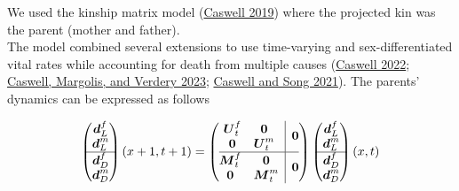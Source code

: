 \documentclass[
  11pt,
  letterpaper,
]{article}
\begin{document}
We used the kinship matrix model (\protect\hyperlink{ref-caswell2019formal}{Caswell 2019}) where the projected kin was the parent (mother and father).\\
The model combined several extensions to use time-varying and sex-differentiated vital rates while accounting for death from multiple causes (\protect\hyperlink{ref-caswell2022formal}{Caswell 2022}; \protect\hyperlink{ref-caswell2023formal}{Caswell, Margolis, and Verdery 2023}; \protect\hyperlink{ref-caswell2021formal}{Caswell and Song 2021}). The parents' dynamics can be expressed as follows

\[\begin{pmatrix} \boldsymbol{d}^f_L \\ 
\boldsymbol{d}^m_L \\ 
\hline \boldsymbol{d}^f_D \\ 
\boldsymbol{d}^m_D 
\end{pmatrix}(x+1, t+1) = 
\left(\begin{array}{@{}c|c@{}}
  \begin{matrix} 
  \boldsymbol{U}^f_t & \boldsymbol{0} \\ 
  \boldsymbol{0} & \boldsymbol{U}^m_t 
  \end{matrix} & \boldsymbol{0} \\
\hline
\begin{matrix} 
  \boldsymbol{M}^f_t & \boldsymbol{0} \\ 
  \boldsymbol{0} & \boldsymbol{M}^m_t 
  \end{matrix} & \boldsymbol{0} \\
\end{array}\right)
\begin{pmatrix} \boldsymbol{d}^f_L \\ 
\boldsymbol{d}^m_L \\ 
\hline \boldsymbol{d}^f_D \\ 
\boldsymbol{d}^m_D
\end{pmatrix}(x, t)\]
\end{document}
